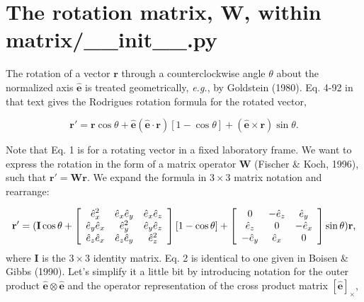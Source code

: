 \documentclass[12pt, letterpaper]{article}
\begin{document}

\section{The rotation matrix, W, within matrix/\_\_init\_\_.py}
  The rotation of a vector $\mathbf{r}$ through a counterclockwise angle $\theta$ about the
  normalized axis $\mathbf{\hat{e}}$ is treated geometrically, \textit{e.g.}, by Goldstein (1980).  Eq. 4-92
  in that text gives the Rodrigues rotation formula for the rotated vector,

  \begin{equation}
    \mathbf{r'} = \mathbf{r} \cos \theta + \mathbf{\hat{e}}(\mathbf{\hat{e}}\cdot\mathbf{r})
    \left[ 1 - \cos \theta \right] + (\mathbf{\hat{e}} \times \mathbf{r}) \sin \theta
    \text{.}
    \label{eqn:rodrigues}
  \end{equation}

  Note that Eq. 1 is for a rotating vector in a fixed laboratory frame.  We want to express
  the rotation in the form of a matrix operator $\mathbf{W}$ (Fischer \& Koch, 1996), such that
  $\mathbf{r'} = \mathbf{W}\mathbf{r}$.  We expand the formula in $3\times3$ matrix notation and
  rearrange:

  \begin{equation}
    \mathbf{r'} = (\mathbf{I} \cos \theta +
    \left[
    \begin{array}{c c c}
       \hat{e}_{x}^2  & \hat{e}_{x}\hat{e}_{y} & \hat{e}_{x}\hat{e}_{z} \\
       \hat{e}_{y}\hat{e}_{x}  & \hat{e}_{y}^2 & \hat{e}_{y}\hat{e}_{z} \\
       \hat{e}_{z}\hat{e}_{x}  & \hat{e}_{z}\hat{e}_{y} & \hat{e}_{z}^2 \\
    \end{array}
    \right]
    \left[ 1 - \cos \theta \right] +
    \left[
    \begin{array}{c c c}
       0  & -\hat{e}_{z} & \hat{e}_{y} \\
       \hat{e}_{z}  & 0 & -\hat{e}_{x} \\
       -\hat{e}_{y}  & \hat{e}_{x} & 0 \\
    \end{array}
    \right] \sin \theta)\mathbf{r}
    \text{,}
    \label{eqn:expansion}
  \end{equation}
  where $\mathbf{I}$ is the $3\times3$ identity matrix.  Eq. 2 is identical to one given in
  Boisen \& Gibbs (1990).  Let's simplify it a little bit by introducing notation for the
  outer product $\mathbf{\hat{e}\otimes\hat{e}}$ and the operator representation of the
  cross product matrix $\left[\mathbf{\hat{e}}\right]_\times$,
\end{document}
